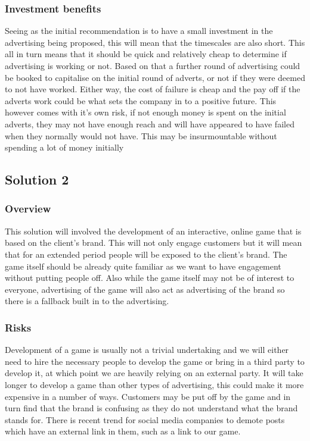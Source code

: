 \documentclass{article}
\begin{document}
\subsubsection{Investment benefits}
Seeing as the initial recommendation is to have a small investment in the advertising being proposed, this will mean that the timescales are also short. This all in turn means that it should be quick and relatively cheap to determine if advertising is working or not. Based on that a further round of advertising could be booked to capitalise on the initial round of adverts, or not if they were deemed to not have worked.
Either way, the cost of failure is cheap and the pay off if the adverts work could be what sets the company in to a positive future.
This however comes with it's own risk, if not enough money is spent on the initial adverts, they may not have enough reach and will have appeared to have failed when they normally would not have. This may be insurmountable without spending a lot of money initially

\subsection{Solution 2}
\subsubsection{Overview}
This solution will involved the development of an interactive, online game that is based on the client's brand. This will not only engage customers but it will mean that for an extended period people will be exposed to the client's brand. 
The game itself should be already quite familiar as we want to have engagement without putting people off. Also while the game itself may not be of interest to everyone, advertising of the game will also act as advertising of the brand so there is a fallback built in to the advertising.

\subsubsection{Risks}
Development of a game is usually not a trivial undertaking and we will either need to hire the necessary people to develop the game or bring in a third party to develop it, at which point we are heavily relying on an external party.
It will take longer to develop a game than other types of advertising, this could make it more expensive in a number of ways.
Customers may be put off by the game and in turn find that the brand is confusing as they do not understand what the brand stands for.
There is recent trend for social media companies to demote posts which have an external link in them, such as a link to our game.
\end{document}
